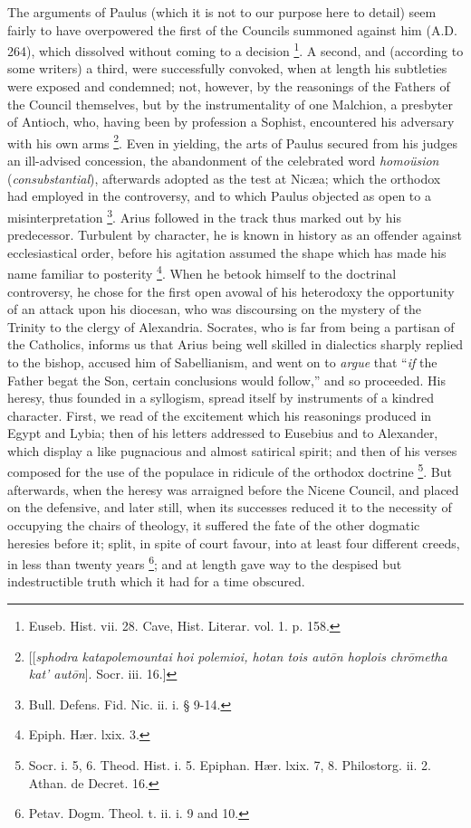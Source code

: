 The arguments of Paulus (which it is not to our purpose here to
detail) seem fairly to have overpowered the first of the Councils
summoned against him (A.D. 264), which dissolved
without coming to a decision \footnote{Euseb. Hist. vii. 28. Cave, Hist. Literar. vol. 1. p. 158.}. A second, and (according to
some writers) a third, were successfully convoked, when at length his
subtleties were exposed and condemned; not, however, by the reasonings
of the Fathers of the Council themselves, but by the instrumentality
of one Malchion, a presbyter of Antioch, who, having been by
profession a Sophist, encountered his adversary with his own arms \footnote{[[\emph{sphodra katapolemountai hoi polemioi,
hotan tois aut\={o}n hoplois chr\={o}metha kat' aut\={o}n}]. Socr. iii. 16.]}. Even in yielding, the arts of Paulus secured from his
judges an ill-advised concession, the abandonment of the celebrated
word \emph{homoüsion} (\emph{consubstantial}), afterwards adopted as
the test at Nicæa; which the orthodox had employed in the
controversy, and to which Paulus objected as open to a
misinterpretation \footnote{Bull. Defens. Fid. Nic. ii. i. § 9-14.}. Arius followed in the track thus marked
out by his predecessor. Turbulent by character, he is known in history
as an offender against ecclesiastical order, before his agitation
assumed the shape which has made his name familiar to posterity \footnote{Epiph. Hær. lxix. 3.}. When he betook himself to the doctrinal controversy, he chose for
the first open avowal of his heterodoxy the opportunity of an attack
upon his diocesan, who was discoursing on the mystery of the Trinity
to the clergy of Alexandria. Socrates, who is far from being a
partisan of the Catholics, informs us that Arius being well skilled in
dialectics sharply replied to the bishop, accused him of Sabellianism,
and went on to \emph{argue} that ``\emph{if} the Father begat the
Son, certain conclusions would follow,'' and so proceeded. His
heresy, thus founded in a syllogism, spread itself by instruments of a
kindred character. First, we read of the excitement which his
reasonings produced in Egypt and Lybia; then of his letters addressed
to Eusebius and to Alexander, which display a like pugnacious and
almost satirical spirit; and then of his verses composed for the use
of the populace in ridicule of the orthodox doctrine \footnote{Socr. i. 5, 6. Theod. Hist. i. 5. Epiphan. Hær. lxix. 7, 8.
Philostorg. ii. 2. Athan. de Decret. 16.}. But
afterwards, when the heresy was arraigned before the Nicene Council, and placed on the defensive, and later still, when its
successes reduced it to the necessity of occupying the chairs of
theology, it suffered the fate of the other dogmatic heresies before
it; split, in spite of court favour, into at least four different
creeds, in less than twenty years \footnote{Petav. Dogm. Theol. t. ii. i. 9 and 10.}; and at length gave way to
the despised but indestructible truth which it had for a time
obscured.

